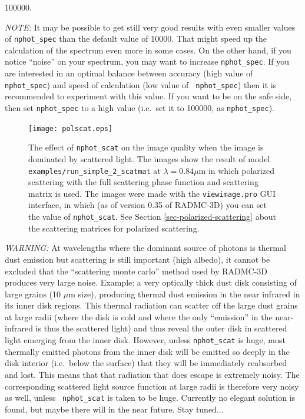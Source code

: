 \documentclass{report}
\begin{document}
\begin{itemize}
\begin{itemize}
{        100000}. 
  \end{itemize}
  {\em NOTE:} It may be possible to get still very good results with even
  smaller values of {\small\tt nphot\_spec} than the default value of
  10000. That might speed up the calculation of the spectrum even more in
  some cases. On the other hand, if you notice ``noise'' on your spectrum,
  you may want to increase {\small\tt nphot\_spec}. If you are interested
  in an optimal balance between accuracy (high value of {\small\tt
    nphot\_spec}) and speed of calculation (low value of {\small\tt
    nphot\_spec}) then it is recommended to experiment with this value.
  If you want to be on the safe side, then set {\small\tt nphot\_spec} to
  a high value (i.e.\ set it to 100000, as {\small\tt nphot\_spec}).
\end{itemize}

\begin{figure}
\centerline{\texttt{[image: polscat.eps]}}
\caption{\label{fig-polscat} The effect of {\small\tt nphot\_scat} on the
  image quality when the image is dominated by scattered light. The images
  show the result of model {\small\tt examples/run\_simple\_2\_scatmat} at
  $\lambda=0.84\mu$m in which polarized scattering with the full scattering
  phase function and scattering matrix is used. The images were made with
  the {\small\tt viewimage.pro} GUI interface, in which (as of version 0.35
  of RADMC-3D) you can set the value of {\small\tt nphot\_scat}. See Section
  \ref{sec-polarized-scattering} about the scattering matrices for polarized
  scattering.}
\end{figure}

{\em WARNING:} At wavelengths where the dominant source of photons is
thermal dust emission but scattering is still important (high albedo), it
cannot be excluded that the ``scattering monte carlo'' method used by
RADMC-3D produces very large noise. Example: a very optically thick dust
disk consisting of large grains (10 $\mu$m size), producing thermal dust
emission in the near infrared in its inner disk regions. This thermal
radiation can scatter off the large dust grains at large radii (where the
disk is cold and where the only ``emission'' in the near-infrared is thus
the scattered light) and thus reveal the outer disk in scattered light
emerging from the inner disk. However, unless {\small\tt nphot\_scat} is
huge, most thermally emitted photons from the inner disk will be emitted so
deeply in the disk interior (i.e.~below the surface) that they will be
immediately reabsorbed and lost. This means that that radiation that does
escape is extremely noisy. The corresponding scattered light source function
at large radii is therefore very noisy as well, unless {\small\tt
  nphot\_scat} is taken to be huge. Currently no elegant solution is 
found, but maybe there will in the near future. Stay tuned... 
\end{document}
